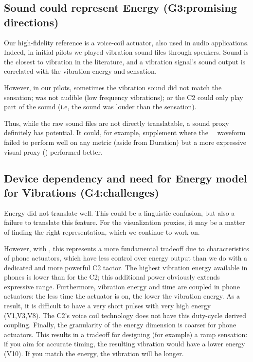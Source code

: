     \subsection{Sound could represent Energy (G3:promising directions)}
Our high-fidelity reference is a voice-coil actuator, also used in audio applications.
Indeed, in initial pilots we played vibration sound files through speakers. Sound is the closest to vibration in the literature, and a vibration signal's sound output is correlated with the vibration energy and sensation. 

However, in our pilots, sometimes the vibration sound did not match the sensation; was not audible (low frequency vibrations); or the C2 could only play part of the sound (i.e, the sound was louder than the sensation).

Thus, while the raw sound files are not directly translatable, a sound proxy definitely has potential. It could, for example, supplement where the \original~\ waveform failed to perform well on any metric (aside from Duration) but a more expressive visual proxy (\linear) performed better.


    \subsection{Device dependency and need for Energy model for Vibrations (G4:challenges)}
     Energy did not translate well.
     This could be a linguistic confusion, but also a failure to translate this feature.
     For the visualization proxies, it may be a matter of finding the right representation, which we continue to work on.
     
     However, with \lofi, this represents a more fundamental tradeoff due to characteristics of phone actuators, which have less control over energy output than we do with a dedicated and more powerful C2 tactor.
     The highest vibration energy available in phones is lower than for the C2;  this additional power obviously extends expressive range.
     Furthermore, vibration energy and time are coupled in phone actuators: the less time the actuator is on, the lower the vibration energy.
     As a result, it is difficult to have a very short pulses with very high energy (V1,V3,V8). The C2's voice coil technology does not have this duty-cycle derived coupling.
     Finally, the granularity of the energy dimension is coarser  for phone actuators.
     This results in a tradeoff for designing (for example) a ramp sensation: if you aim for accurate timing, the resulting vibration would have a lower energy (V10).
     If you match the energy, the vibration will be longer.
     
